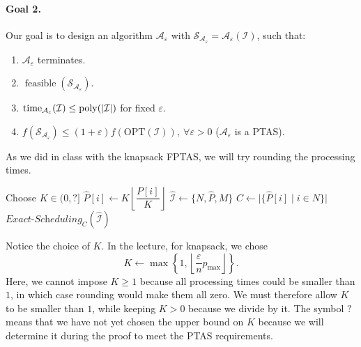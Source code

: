 \documentclass[12pt,a4paper]{article}
\theoremstyle{definition}
\theoremstyle{plain}
\begin{document}
\paragraph{Goal 2.}
Our goal is to design an algorithm $\mathcal{A}_{\varepsilon}$ with
$\mathcal{S}_{\mathcal{A}_{\varepsilon}}=\mathcal{A}_{\varepsilon}(\mathcal{I})$,
such that:
\begin{enumerate}
\item $\mathcal{A}_{\varepsilon}$ terminates.
\item $\operatorname{feasible}(\mathcal{S}_{\mathcal{A}_{\varepsilon}})$.
\item $\operatorname{time}_{\mathcal{A}_{\varepsilon}}(\mathcal{I})
\leq\operatorname{poly}(|\mathcal{I}|)$ for fixed $\varepsilon$.
\item $f(\mathcal{S}_{\mathcal{A}_{\varepsilon}})
\leq(1+\varepsilon)f(\mathrm{OPT}(\mathcal{I})),\ \forall\varepsilon>0$
($\mathcal{A}_{\varepsilon}$ is a PTAS).
\end{enumerate}

As we did in class with the knapsack FPTAS, we will try rounding the processing times.

\begin{algorithm}[htbp]
\caption{$\textit{Maybe-PTAS-Scheduling}(\mathcal{I},\varepsilon)$}
\begin{algorithmic}[1]
\State Choose $K\in(0,?]$
\State $\widehat{P}[i]\gets K\left\lfloor\dfrac{P[i]}{K}\right\rfloor$
\EndFor
\State $\widehat{\mathcal{I}}\gets\{N,\widehat{P},M\}$
\State $C\gets\bigl|\{\widehat{P}[i]\mid i\in N\}\bigr|$
\State \Return $\textit{Exact-Scheduling}_C(\widehat{\mathcal{I}})$
\end{algorithmic}
\end{algorithm}

Notice the choice of $K$. In the lecture, for knapsack, we chose
\[
K\gets\max\left\{1,\left\lfloor\frac{\varepsilon}{n}p_{\max}\right\rfloor\right\}.
\]
Here, we cannot impose $K\geq1$ because all processing times could be smaller
than $1$, in which case rounding would make them all zero. We must
therefore allow $K$ to be smaller than $1$, while keeping $K>0$ because
we divide by it. The symbol $?$ means that we have not yet chosen the
upper bound on $K$ because we will determine it during the proof to meet
the PTAS requirements.
\end{document}
